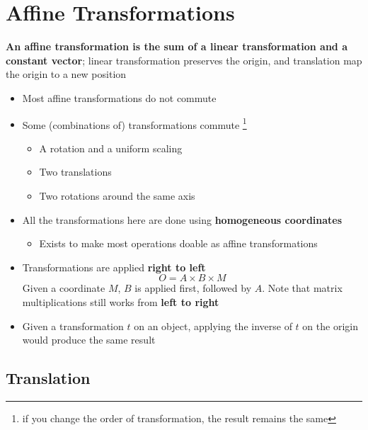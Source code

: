 \chapter{Affine Transformations}

\textbf{An affine transformation is the sum of a linear transformation and a
constant vector}; linear transformation preserves the origin, and translation
map the origin to a new position

\begin{itemize}
  \item Most affine transformations do not commute
  \item Some (combinations of) transformations commute
  \footnote{if you change the order of transformation, the result remains the
  same}
  \begin{itemize}
    \item A rotation and a uniform scaling
    \item Two translations
    \item Two rotations around the same axis
  \end{itemize}

  \item All the transformations here are done using \textbf{homogeneous
  coordinates}
  \begin{itemize}
    \item Exists to make most operations doable as affine transformations
  \end{itemize}

  \item Transformations are applied \textbf{right to left}
  \begin{equation*}
    O = A \times B \times M
  \end{equation*}
  Given a coordinate $ M $, $ B $ is applied first, followed by $ A $. Note
  that matrix multiplications still works from \textbf{left to right}

  \item Given a transformation $ t $ on an object, applying the inverse of
  $ t $ on the origin would produce the same result
\end{itemize}

\section{Translation}

